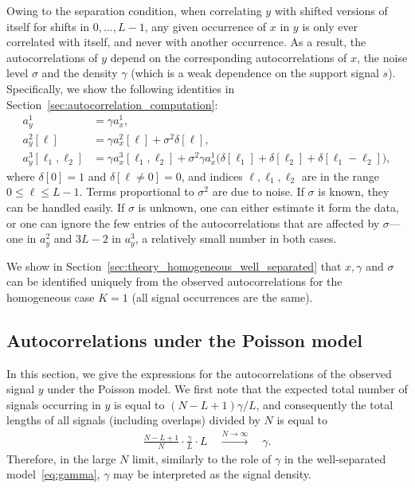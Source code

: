 \documentclass[12pt]{article}
\newcommand{\1}{\mathbf{1}}
\newcommand{\Poisson}{\text{Poisson}}
\newcommand{\TODO}[1]{{\color{red}{[#1]}}}
\theoremstyle{plain}
\theoremstyle{definition}
\theoremstyle{remark}
\theoremstyle{plain}
\theoremstyle{remark}
\theoremstyle{plain}
\theoremstyle{plain}
\theoremstyle{plain}
\numberwithin{equation}{section}
\begin{document}
Owing to the separation condition, when correlating $y$ with shifted versions of itself for shifts in $0, \ldots, L-1$, any given occurrence of $x$ in $y$ is only ever correlated with itself, and never with another occurrence. As a result, the autocorrelations of $y$ depend on the corresponding autocorrelations of $x$, the noise level $\sigma$ and the density $\gamma$ (which is a weak dependence on the support signal $s$). Specifically, we show the following identities in Section~\ref{sec:autocorrelation_computation}:
\begin{align} 
	a_y^1 & = \gamma a_{x}^1, \label{eq:mean_micrograph} \\
	a_y^2[\ell] & = \gamma a_{x}^2[\ell] + \sigma^2\delta[\ell], \label{eq:ac2_micrograph}\\
	a_y^3[\ell_1,\ell_2] & = \gamma a_{x}^3[\ell_1,\ell_2]  + \sigma^2\gamma a_{x}^1  \big(\delta[\ell_1]+\delta[\ell_2]
	+\delta[\ell_1-\ell_2]\big), \label{eq:ac3_micrograph}
\end{align}
where $\delta[0] = 1$ and $\delta[\ell \neq 0] = 0$, and indices $\ell, \ell_1, \ell_2$ are in the range $0 \leq \ell \leq L-1$. Terms proportional to $\sigma^2$ are due to noise. If $\sigma$ is known, they can be handled easily. If $\sigma$ is unknown, one can either estimate it form the data, or one can ignore the few entries of the autocorrelations that are affected by $\sigma$---one in $a_y^2$ and $3L-2$ in $a_y^3$, a relatively small number in both cases.


We show in Section~\ref{sec:theory_homogeneous_well_separated} 
that $x,\gamma$ and $\sigma$ can be identified uniquely from the observed autocorrelations for the homogeneous case $K = 1$ (all signal occurrences are the same). \TODO{Do we also need to say "for generic $x$" here, as in Poisson?}

\subsection{Autocorrelations under the Poisson model} \label{sec:ac_poisson}

In this section, we give the expressions for the autocorrelations of the observed signal $y$ under the Poisson model. %
 We first note that the expected total number of signals occurring in $y$ is equal to $(N - L + 1)\gamma / L$, and consequently the total lengths of all signals (including overlaps) divided by $N$ is equal to
%
\begin{align}
\frac{N - L + 1}{N} \cdot \frac{\gamma  }{L}  \cdot L 
\quad \overset{N\to\infty}{\longrightarrow} \quad \gamma.
\end{align}
%
Therefore, in the large $N$ limit, similarly to the role of $\gamma$ in the well-separated model~\eqref{eq:gamma}, $\gamma$ may be interpreted as the signal density.
\end{document}
